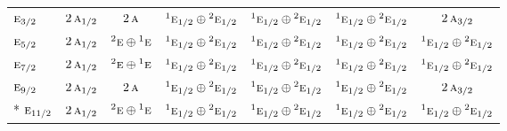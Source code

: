 \documentclass[10pt,a4paper]{article}
\numberwithin{equation}{section}
\newcommand{\irr}[1]{\text{\normalfont\scshape #1}}
\newcommand{\conjpair}[1]{{}^{#1}}
\begin{document}
{\begin{longtable}{@{}lcccccc@{}}
$\irr{e}_{3/2}$ & $2\,\irr{a}_{1/2}$ & $2\,\irr{a}$ & $\conjpair{1}\irr{e}_{1/2}\oplus \conjpair{2}\irr{e}_{1/2}$ & $\conjpair{1}\irr{e}_{1/2}\oplus \conjpair{2}\irr{e}_{1/2}$ & $\conjpair{1}\irr{e}_{1/2}\oplus \conjpair{2}\irr{e}_{1/2}$ & $2\,\irr{a}_{3/2}$\\
$\irr{e}_{5/2}$ & $2\,\irr{a}_{1/2}$ & $\conjpair{2}\irr{e}\oplus \conjpair{1}\irr{e}$ & $\conjpair{1}\irr{e}_{1/2}\oplus \conjpair{2}\irr{e}_{1/2}$ & $\conjpair{1}\irr{e}_{1/2}\oplus \conjpair{2}\irr{e}_{1/2}$ & $\conjpair{1}\irr{e}_{1/2}\oplus \conjpair{2}\irr{e}_{1/2}$ & $\conjpair{1}\irr{e}_{1/2}\oplus \conjpair{2}\irr{e}_{1/2}$\\
$\irr{e}_{7/2}$ & $2\,\irr{a}_{1/2}$ & $\conjpair{2}\irr{e}\oplus \conjpair{1}\irr{e}$ & $\conjpair{1}\irr{e}_{1/2}\oplus \conjpair{2}\irr{e}_{1/2}$ & $\conjpair{1}\irr{e}_{1/2}\oplus \conjpair{2}\irr{e}_{1/2}$ & $\conjpair{1}\irr{e}_{1/2}\oplus \conjpair{2}\irr{e}_{1/2}$ & $\conjpair{1}\irr{e}_{1/2}\oplus \conjpair{2}\irr{e}_{1/2}$\\
$\irr{e}_{9/2}$ & $2\,\irr{a}_{1/2}$ & $2\,\irr{a}$ & $\conjpair{1}\irr{e}_{1/2}\oplus \conjpair{2}\irr{e}_{1/2}$ & $\conjpair{1}\irr{e}_{1/2}\oplus \conjpair{2}\irr{e}_{1/2}$ & $\conjpair{1}\irr{e}_{1/2}\oplus \conjpair{2}\irr{e}_{1/2}$ & $2\,\irr{a}_{3/2}$\\*
$\irr{e}_{11/2}$ & $2\,\irr{a}_{1/2}$ & $\conjpair{2}\irr{e}\oplus \conjpair{1}\irr{e}$ & $\conjpair{1}\irr{e}_{1/2}\oplus \conjpair{2}\irr{e}_{1/2}$ & $\conjpair{1}\irr{e}_{1/2}\oplus \conjpair{2}\irr{e}_{1/2}$ & $\conjpair{1}\irr{e}_{1/2}\oplus \conjpair{2}\irr{e}_{1/2}$ & $\conjpair{1}\irr{e}_{1/2}\oplus \conjpair{2}\irr{e}_{1/2}$\\
\bottomrule\end{longtable}}
\end{document}
